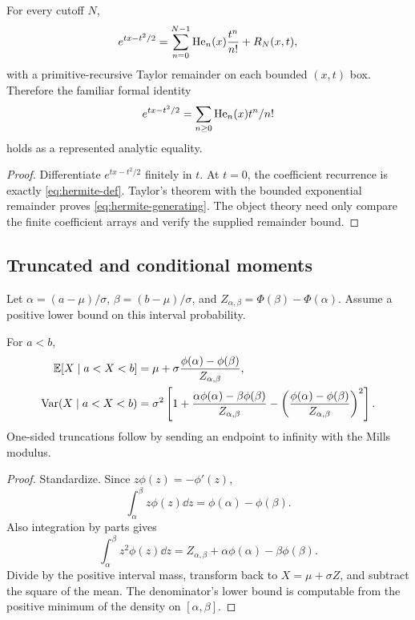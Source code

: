 \begin{corollary}\label{cor:hermite-generating}
For every cutoff $N$,
\begin{equation}\label{eq:hermite-generating}
 e^{tx-t^2/2}=\sum_{n=0}^{N-1}\operatorname{He}_n(x)\frac{t^n}{n!}+R_N(x,t),
\end{equation}
with a primitive-recursive Taylor remainder on each bounded $(x,t)$ box.  Therefore the familiar formal identity
\[
 e^{tx-t^2/2}=\sum_{n\ge0}\operatorname{He}_n(x)t^n/n!
\]
holds as a represented analytic equality.
\end{corollary}

\begin{proof}
Differentiate $e^{tx-t^2/2}$ finitely in $t$.  At $t=0$, the coefficient recurrence is exactly \eqref{eq:hermite-def}.  Taylor's theorem with the bounded exponential remainder proves \eqref{eq:hermite-generating}.  The object theory need only compare the finite coefficient arrays and verify the supplied remainder bound.
\end{proof}

\subsection{Truncated and conditional moments}

Let $\alpha=(a-\mu)/\sigma$, $\beta=(b-\mu)/\sigma$, and
$Z_{\alpha,\beta}=\Phi(\beta)-\Phi(\alpha)$.  Assume a positive lower bound on this interval probability.

\begin{theorem}\label{thm:truncated-normal}
For $a<b$,
\begin{align}
 \mathbb E[X\mid a<X<b]
 &=\mu+\sigma\frac{\phi(\alpha)-\phi(\beta)}{Z_{\alpha,\beta}},\label{eq:trunc-mean}\\
 \operatorname{Var}(X\mid a<X<b)
 &=\sigma^2\left[
 1+\frac{\alpha\phi(\alpha)-\beta\phi(\beta)}{Z_{\alpha,\beta}}
 -\left(\frac{\phi(\alpha)-\phi(\beta)}{Z_{\alpha,\beta}}\right)^2
 \right].\label{eq:trunc-var}
\end{align}
One-sided truncations follow by sending an endpoint to infinity with the Mills modulus.
\end{theorem}

\begin{proof}
Standardize.  Since $z\phi(z)=-\phi'(z)$,
\[
 \int_\alpha^\beta z\phi(z)\dd z=\phi(\alpha)-\phi(\beta).
\]
Also integration by parts gives
\[
 \int_\alpha^\beta z^2\phi(z)\dd z
 =Z_{\alpha,\beta}+\alpha\phi(\alpha)-\beta\phi(\beta).
\]
Divide by the positive interval mass, transform back to $X=\mu+\sigma Z$, and subtract the square of the mean.  The denominator's lower bound is computable from the positive minimum of the density on $[\alpha,\beta]$.
\end{proof}

